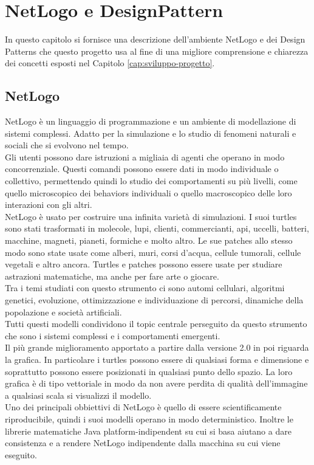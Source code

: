 \chapter{NetLogo e DesignPattern}
In questo capitolo si fornisce una descrizione dell'ambiente NetLogo e dei Design Patterns che questo progetto usa al fine di una migliore comprensione e chiarezza dei concetti esposti nel Capitolo \ref{cap:sviluppo-progetto}.
\section {NetLogo} 
\label{sec:netlogo}
NetLogo \nocite{wilensky-tisue} \cite{netlogo} è un linguaggio di programmazione e un ambiente di modellazione di sistemi complessi. Adatto per la simulazione e lo studio di fenomeni naturali e sociali che si evolvono nel tempo.\\
Gli utenti possono dare istruzioni a migliaia di agenti che operano in modo concorrenziale. Questi comandi possono essere dati in modo individuale o collettivo, permettendo quindi lo studio dei comportamenti su più livelli, come quello microscopico dei behaviors individuali o quello macroscopico delle loro interazioni con gli altri.\\
NetLogo è usato per costruire una infinita varietà di simulazioni. I suoi turtles sono stati trasformati in molecole, lupi, clienti, commercianti, api, uccelli, batteri, macchine, magneti, pianeti, formiche e molto altro. Le sue patches allo stesso modo sono state usate come alberi, muri, corsi d'acqua, cellule tumorali, cellule vegetali e altro ancora. Turtles e patches possono essere usate per studiare astrazioni matematiche, ma anche per fare arte o giocare.\\
Tra i temi studiati con questo strumento ci sono automi cellulari, algoritmi genetici, evoluzione, ottimizzazione e individuazione di percorsi, dinamiche della popolazione e società artificiali.\\
Tutti questi modelli condividono il topic centrale perseguito da questo strumento che sono i sistemi complessi e i comportamenti emergenti.\\
Il più grande miglioramento apportato a partire dalla versione 2.0 in poi riguarda la grafica. In particolare i turtles possono essere di qualsiasi forma e dimensione e soprattutto possono essere posizionati in qualsiasi punto dello spazio. La loro grafica è di tipo vettoriale in modo da non avere perdita di qualità dell'immagine a qualsiasi scala si visualizzi il modello.\\
Uno dei principali obbiettivi di NetLogo è quello di essere scientificamente riproducibile, quindi i suoi modelli operano in modo deterministico. Inoltre le librerie matematiche Java platform-indipendent su cui si basa aiutano a dare consistenza e a rendere NetLogo indipendente dalla macchina su cui viene eseguito.\\

